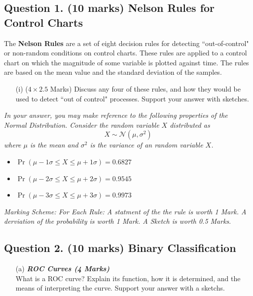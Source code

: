 \documentclass[a4paper,12pt]{article}
\begin{document}
\subsection*{Question 1. (10 marks) Nelson Rules for Control Charts}
The \textbf{Nelson Rules} are a set of eight decision rules for detecting ``out-of-control" or non-random conditions on control charts. These rules are applied to a control chart on which the magnitude of some variable is plotted against time. The rules are based on the mean value and the standard deviation of the samples.\\

\begin{itemize}
	\item[(i)] ($4 \times 2.5$ Marks) Discuss any four of these rules, and how they would be used to detect ``out of control" processes. Support your answer with sketches.
\end{itemize}

\bigskip 
\begin{framed}
	\noindent \textit{In your answer, you may make reference to the following properties of the Normal Distribution. Consider the random variable $X$ distributed as
		\[X \sim \mathcal{N}(\mu,\sigma^2)\]
		where $\mu$ is the mean and $\sigma^2$ is the variance of an random variable $X$.}
	\begin{itemize}
		\item $\Pr( \mu - 1\sigma \leq X \leq \mu + 1\sigma ) = 0.6827$
		\item $\Pr( \mu - 2\sigma \leq X \leq \mu + 2\sigma ) = 0.9545$
		\item $\Pr( \mu - 3\sigma \leq X \leq \mu + 3\sigma )= 0.9973$
		
	\end{itemize}
\end{framed}
\noindent \textit{Marking Scheme: For Each Rule: A statment of the the rule is worth 1 Mark. A derviation of the probability is worth 1 Mark. A Sketch is worth 0.5 Marks}.
\newpage


\newpage
\subsection*{Question 2. (10 marks) Binary Classification }
\begin{itemize}
	\item[(a)]  \textbf{\textit{ROC Curves	(4 Marks) }}\\
	What is a ROC curve? Explain its function, how it is determined, and the means of interpreting the curve. Support your answer with a sketchs.
\end{itemize}
\bigskip
\end{document}
